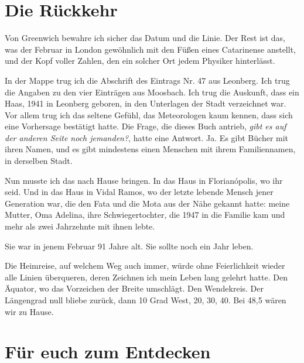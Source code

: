 \documentclass[
  ngerman,
  11pt,
  openany]{book}
\begin{document}
\section{Die Rückkehr}\label{die-ruxfcckkehr}

Von Greenwich bewahre ich sicher das Datum und die Linie. Der Rest ist
das, was der Februar in London gewöhnlich mit den Füßen eines
Catarinense anstellt, und der Kopf voller Zahlen, den ein solcher Ort
jedem Physiker hinterlässt.

In der Mappe trug ich die Abschrift des Eintrags Nr. 47 aus Leonberg.
Ich trug die Angaben zu den vier Einträgen aus Moosbach. Ich trug die
Auskunft, dass ein Haas, 1941 in Leonberg geboren, in den Unterlagen der
Stadt verzeichnet war. Vor allem trug ich das seltene Gefühl, das
Meteorologen kaum kennen, dass sich eine Vorhersage bestätigt hatte. Die
Frage, die dieses Buch antrieb, \emph{gibt es auf der anderen Seite noch
jemanden?}, hatte eine Antwort. Ja. Es gibt Bücher mit ihren Namen, und
es gibt mindestens einen Menschen mit ihrem Familiennamen, in derselben
Stadt.

Nun musste ich das nach Hause bringen. In das Haus in Florianópolis, wo
ihr seid. Und in das Haus in Vidal Ramos, wo der letzte lebende Mensch
jener Generation war, die den Fata und die Mota aus der Nähe gekannt
hatte: meine Mutter, Oma Adelina, ihre Schwiegertochter, die 1947 in die
Familie kam und mehr als zwei Jahrzehnte mit ihnen lebte.

Sie war in jenem Februar 91 Jahre alt. Sie sollte noch ein Jahr leben.

Die Heimreise, auf welchem Weg auch immer, würde ohne Feierlichkeit
wieder alle Linien überqueren, deren Zeichnen ich mein Leben lang
gelehrt hatte. Den Äquator, wo das Vorzeichen der Breite umschlägt. Den
Wendekreis. Der Längengrad null bliebe zurück, dann 10 Grad West, 20,
30, 40. Bei 48,5 wären wir zu Hause.

\section{Für euch zum Entdecken}\label{fuxfcr-euch-zum-entdecken-18}
\end{document}
